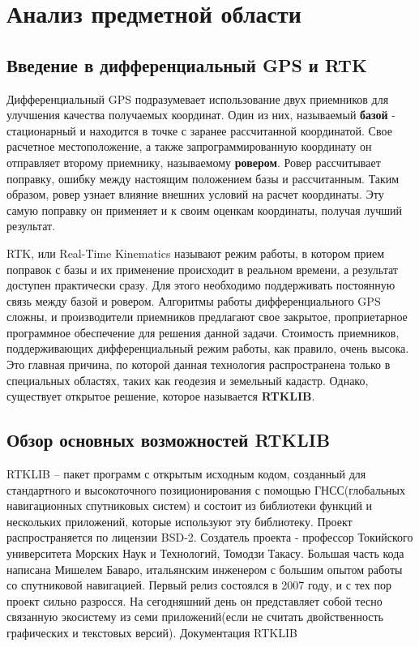 \chapter{Анализ предметной области} \label{chapt1}

\section{Введение в дифференциальный GPS и RTK} \label{sect1_1}

Дифференциальный GPS подразумевает использование двух приемников для улучшения качества получаемых координат. Один из них, называемый \textbf{базой} - стационарный и находится в точке с заранее рассчитанной координатой. Свое расчетное местоположение, а также запрограммированную координату он отправляет второму приемнику, называемому \textbf{ровером}. Ровер рассчитывает поправку, ошибку между настоящим положением базы и рассчитанным. Таким образом, ровер узнает влияние внешних условий на расчет координаты. Эту самую поправку он применяет и к своим оценкам координаты, получая лучший результат.

RTK, или Real-Time Kinematics называют режим работы, в котором прием поправок с базы и их применение происходит в реальном времени, а результат доступен практически сразу. Для этого необходимо поддерживать постоянную связь между базой и ровером. Алгоритмы работы дифференциального GPS сложны, и производители приемников предлагают свое закрытое, проприетарное программное обеспечение для решения данной задачи. Стоимость приемников, поддерживающих дифференциальный режим работы, как правило, очень высока. Это главная причина, по которой данная технология распространена только в специальных областях, таких как геодезия и земельный кадастр. Однако, существует открытое решение, которое называется \textbf{RTKLIB}.

\section{Обзор основных возможностей RTKLIB} \label{sect1_2}

RTKLIB – пакет программ с открытым исходным кодом, созданный для стандартного и высокоточного позиционирования с помощью ГНСС(глобальных навигационных спутниковых систем) и состоит из библиотеки функций и нескольких приложений, которые используют эту библиотеку. Проект распространяется по лицензии BSD-2. Создатель проекта -  профессор Токийского университета Морских Наук и Технологий, Томодзи Такасу. Большая часть кода написана Мишелем Баваро, итальянским инженером с большим опытом работы со спутниковой навигацией. Первый релиз состоялся в 2007 году, и с тех пор проект сильно разросся. На сегодняшний день он представляет собой тесно связанную экосистему из семи приложений(если не считать двойственность графических и текстовых версий). Документация RTKLIB %


